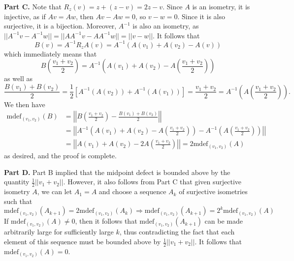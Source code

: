 \documentclass[aps,pra,showpacs,notitlepage,onecolumn,superscriptaddress,nofootinbib]{revtex4-1}
\theoremstyle{definition}
\begin{document}
\noindent \textbf{Part C.} Note that $R_z(v) = z + (z - v) = 2z - v$. Since $A$ is an isometry, it is injective, as if $Av = Aw$, then $Av - Aw = 0$, so $v - w = 0$. Since it is also surjective, it is a bijection. Moreover,
$A^{-1}$ is also an isometry, as $||A^{-1} v - A^{-1} w|| = ||A A^{-1} v - A A^{-1} w || = ||v - w||$. It follows that
\begin{equation}
  B \left( v \right) = A^{-1} R_z A \left( v \right) = A^{-1} \left( A(v_1) + A(v_2) - A \left( v\right) \right)
\end{equation}
which immediately means that
\begin{equation}
  B\left(\frac{v_1 + v_2}{2}\right) = A^{-1} \left( A(v_1) + A(v_2) - A \left( \frac{v_1 + v_2}{2} \right) \right)
\end{equation}
as well as
\begin{equation}
  \frac{B(v_1) + B(v_2)}{2} = \frac{1}{2} \left[ A^{-1}(A(v_2)) + A^{-1}(A(v_1)) \right] = \frac{v_1 + v_2}{2} = A^{-1} \left( A \left( \frac{v_1 + v_2}{2} \right) \right).
\end{equation}
We then have
\begin{align}
  \text{mdef}_{(v_1, v_2)}(B) &= \left|\left| B\left(\frac{v_1 + v_2}{2}\right) -  \frac{B(v_1) + B(v_2)}{2} \right|\right|
  \\ &= \left|\left| A^{-1} \left( A(v_1) + A(v_2) - A \left( \frac{v_1 + v_2}{2} \right) \right) -  A^{-1} \left( A \left( \frac{v_1 + v_2}{2} \right) \right) \right|\right|
  \\ &= \left|\left| A(v_1) + A(v_2) - 2 A \left( \frac{v_1 + v_2}{2} \right) \right|\right| = 2 \text{mdef}_{(v_1, v_2)}(A)
\end{align}
as desired, and the proof is complete.
\newline

\noindent \textbf{Part D.} Part B implied that the midpoint defect is bounded above by the quantity $\frac{1}{2} ||v_1 + v_2||$. However, it also follows from Part C that given surjective isometry $A$,
we can let $A_1 = A$ and choose a sequence $A_k$ of surjective isometries such that
\begin{equation}
  \text{mdef}_{(v_1, v_2)}(A_{k+1}) = 2 \text{mdef}_{(v_1, v_2)}(A_k) \Longrightarrow \text{mdef}_{(v_1, v_2)}(A_{k+1}) = 2^k \text{mdef}_{(v_1, v_2)}(A)
\end{equation}
If $\text{mdef}_{(v_1, v_2)}(A) \neq 0$, then it follows that $\text{mdef}_{(v_1, v_2)}(A_{k+1})$ can be made arbitrarily large for sufficiently large $k$, thus contradicting the fact that
each element of this sequence must be bounded above by $\frac{1}{2} ||v_1 + v_2||$. It follows that $\text{mdef}_{(v_1, v_2)}(A) = 0$.
\newline
\end{document}
